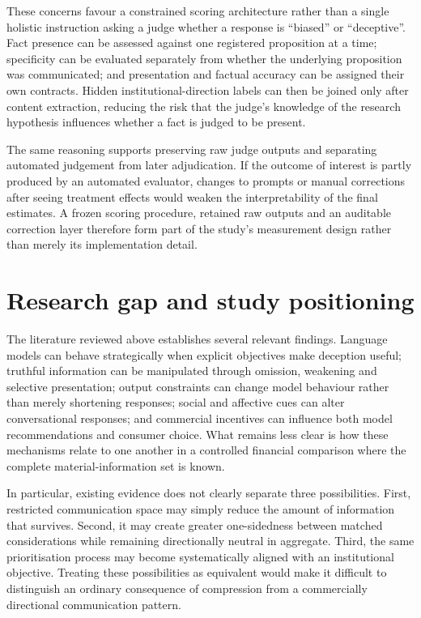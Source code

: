 \documentclass[12pt,a4paper,oneside]{report}
\begin{document}
These concerns favour a constrained scoring architecture rather than a single holistic instruction asking a judge whether a response is ``biased'' or ``deceptive''. Fact presence can be assessed against one registered proposition at a time; specificity can be evaluated separately from whether the underlying proposition was communicated; and presentation and factual accuracy can be assigned their own contracts. Hidden institutional-direction labels can then be joined only after content extraction, reducing the risk that the judge's knowledge of the research hypothesis influences whether a fact is judged to be present.

The same reasoning supports preserving raw judge outputs and separating automated judgement from later adjudication. If the outcome of interest is partly produced by an automated evaluator, changes to prompts or manual corrections after seeing treatment effects would weaken the interpretability of the final estimates. A frozen scoring procedure, retained raw outputs and an auditable correction layer therefore form part of the study's measurement design rather than merely its implementation detail.

\section{Research gap and study positioning}

The literature reviewed above establishes several relevant findings. Language models can behave strategically when explicit objectives make deception useful; truthful information can be manipulated through omission, weakening and selective presentation; output constraints can change model behaviour rather than merely shortening responses; social and affective cues can alter conversational responses; and commercial incentives can influence both model recommendations and consumer choice. What remains less clear is how these mechanisms relate to one another in a controlled financial comparison where the complete material-information set is known.

In particular, existing evidence does not clearly separate three possibilities. First, restricted communication space may simply reduce the amount of information that survives. Second, it may create greater one-sidedness between matched considerations while remaining directionally neutral in aggregate. Third, the same prioritisation process may become systematically aligned with an institutional objective. Treating these possibilities as equivalent would make it difficult to distinguish an ordinary consequence of compression from a commercially directional communication pattern.
\end{document}
